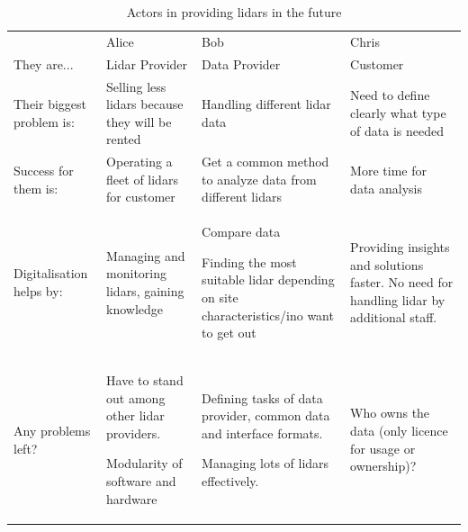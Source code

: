 \begin{table}[!h]
    \centering
    \caption{Actors in providing lidars in the future}
    \begin{tabular}{@{}|p{}|p{}|p{}|p{}|@{}}
    \rowcolor{Task32Blue2} & Alice & Bob & Chris \\
    They are... & 
        Lidar Provider & Data Provider & Customer \\
    Their biggest problem is: &
        Selling less lidars because they will be rented &
        Handling different lidar data & 
        Need to define clearly what type of data is needed \\
    Success for them is: & 
        Operating a fleet of lidars for customer & 
        Get a common method to analyze data from different lidars & 
        More time for data analysis \\
    Digitalisation helps by: &
        Managing and monitoring lidars, gaining knowledge &
        Compare data

        Finding the most suitable lidar depending on site characteristics/ino want to get out &
        Providing insights and solutions faster. No need for handling lidar by additional staff. \\
    Any problems left? & 
        Have to stand out among other lidar providers.

        Modularity of software and hardware & 
        Defining tasks of data provider, common data and interface formats. 
    
        Managing lots of lidars effectively. &
        Who owns the data (only licence for usage or ownership)?
\end{tabular}
\label{tab:04_lidarSolutionsProvider_future}
\end{table}
